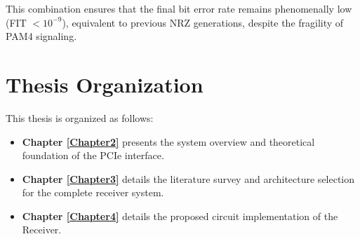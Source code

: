 This combination ensures that the final bit error rate remains phenomenally low (FIT $< 10^{-9}$), equivalent to previous NRZ generations, despite the fragility of PAM4 signaling.

\section*{Thesis Organization}
This thesis is organized as follows:
\begin{itemize}
    \item \textbf{Chapter \ref{Chapter2}} presents the system overview and theoretical foundation of the PCIe interface.
    \item \textbf{Chapter \ref{Chapter3}} details the literature survey and architecture selection for the complete receiver system.
    \item \textbf{Chapter \ref{Chapter4}} details the proposed circuit implementation of the Receiver.
\end{itemize}